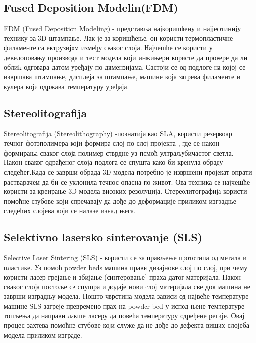 \documentclass[a4paper]{article}
\begin{document}
{\subsection{Fused Deposition Modelin(FDM)}
\label{subsec:podnaslov2}
FDM (Fused Deposition Modeling) - представља најкоришћену и најјефтинију технику за 3D штампање. Лак је за коришћење, он користи термопластичне филаменте са ектрузијом између сваког слоја.
\bigbreak Најчешће се користи у девелоповању производа  и тест модела који инжињери користе да провере да ли облиk одговара датом уређају по димензијама. 
\bigbreak Састоји се од подлоге на којој се извршава штампање, дисплеја за штампање, машине која загрева филаменте и кулера који одржава температуру уређаја.

 
\subsection{Stereolitografija}
\label{subsec:podnaslov3}
Stereolitografija (Stereolithography) -познатија као SLA, користи резервоар течног фотополимера који формира слој по слој пројекта , где се након формирања сваког слоја полимер стврдне уз помоћ ултраљубичастог светла.
\bigbreak Након сваког одрађеног слоја подлога се спушта како би кренула обраду следећег.Када се заврши обрада 3D модела потребно је извршени пројекат опрати растварачем да би се уклонила течнос опасна по живот.
\bigbreak Ова техника се најчешће користи за креирање 3D модела високих резолуција.  Стереолитографија користи помоћне стубове који спречавају да дође до деформације приликом изградње следећих слојева који се налазе изнад њега.

\subsection{Selektivno lasersko sinterovanje (SLS)}
\label{subsec:podnaslov4}
Selective Laser Sintering (SLS) - користи се за прављење прототипа од метала и пластике. Уз помоћ powder beds машина прави дизајнове слој по слој, при чему користи  ласер грејање и збијање (синтеровање) праха датог материјала. 
\bigbreak Након сваког слоја постоље се спушра и додаје нови слој материјала све док машина не заврши изградњу модела. Пошто чврстина модела зависи од највеће температуре машине SLS загреје превремено прах на powder bed-у испод њене температуре топљења да направи лакше ласеру да повећа температуру одређене регије. 
\bigbreak Овај процес захтева помоћне стубове који служе да не дође до дефекта виших слојеба модела приликом изграде.

}
\end{document}
